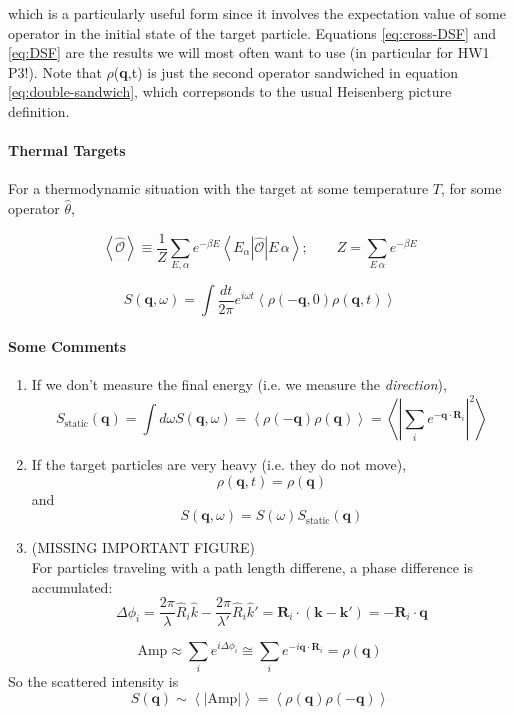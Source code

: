 \documentclass{article}
\begin{document}
			which is a particularly useful form since it involves the expectation value of some operator in the initial state of the target particle. Equations \ref{eq:cross-DSF} and \ref{eq:DSF} are the results we will most often want to use (in particular for HW1 P3!). Note that $\rho$(\textbf{q},t) is just the second operator sandwiched in equation \ref{eq:double-sandwich}, which correpsonds to the usual Heisenberg picture definition. 
			
			\paragraph{Thermal Targets} For a thermodynamic situation with the target at some temperature $T$, for some operator $\hat{\theta}$,
			
			$$\left<\hat{\mathcal{O}}\right>\equiv \frac{1}{Z}\sum_{E,\alpha}e^{-\beta E}\left<E_\alpha\left|\hat{\mathcal{O}}\right|E\,\alpha\right>;\qquad Z=\sum_{E\,\alpha}e^{-\beta E}$$
			\begin{center}
				$$\displaystyle S(\mathbf{q},\omega)=\int\frac{dt}{2\pi}e^{i\omega t}\left<\rho(-\mathbf{q},0)\rho(\mathbf{q},t)\right>$$
			\end{center}
			\paragraph{Some Comments}
			\begin{enumerate}
				\item If we don't measure the final energy (i.e. we measure the \emph{direction}),
				$$S_{\mathrm{static}}(\mathbf{q})=\int d\omega S(\mathbf{q},\omega)=\left<\rho(-\mathbf{q})\rho(\mathbf{q})\right>=\left<\left|\sum_ie^{-\mathbf{q}\cdot\mathbf{R}_i}\right|^2\right>$$
				\item If the target particles are very heavy (i.e. they do not move),
				$$\rho(\mathbf{q},t)=\rho(\mathbf{q})$$
				and
				$$S(\mathbf{q},\omega)=S(\omega)S_{\mathrm{static}}(\mathbf{q})$$
				\item (MISSING IMPORTANT FIGURE)\\
				
				\noindent For particles traveling with a path length differene, a phase difference is accumulated:
				$$\Delta \phi_i=\frac{2\pi}{\lambda}\hat{R}_i\hat{k}-\frac{2\pi}{\lambda'}\hat{R}_i\hat{k}'=\mathbf{R}_i\cdot(\mathbf{k}-\mathbf{k}')=-\mathbf{R}_i\cdot\mathbf{q}$$
			\end{enumerate}
			$$\mathrm{Amp}\approx \sum_i e^{i\Delta\phi_i}\cong \sum_ie^{-i\mathbf{q}\cdot\mathbf{R}_i}=\rho(\mathbf{q})$$
			So the scattered intensity is
			$$S(\mathbf{q})\sim\left<\left|\mathrm{Amp}\right|\right>=\left<\rho(\mathbf{q})\rho(-\mathbf{q})\right>$$
\end{document}
